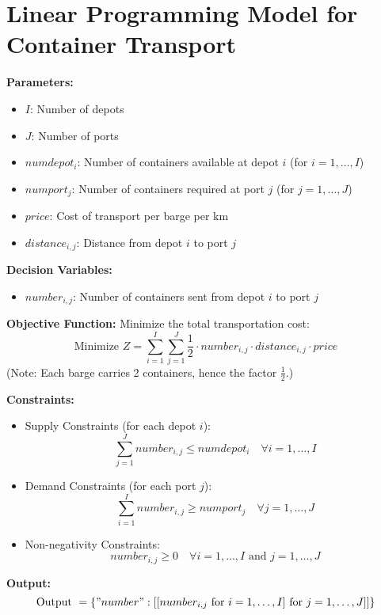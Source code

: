 \documentclass{article}
\begin{document}
\section*{Linear Programming Model for Container Transport}

\textbf{Parameters:}
\begin{itemize}
    \item $I$: Number of depots
    \item $J$: Number of ports
    \item $numdepot_i$: Number of containers available at depot $i$ (for $i = 1, \ldots, I$)
    \item $numport_j$: Number of containers required at port $j$ (for $j = 1, \ldots, J$)
    \item $price$: Cost of transport per barge per km
    \item $distance_{i,j}$: Distance from depot $i$ to port $j$
\end{itemize}

\textbf{Decision Variables:}
\begin{itemize}
    \item $number_{i,j}$: Number of containers sent from depot $i$ to port $j$
\end{itemize}

\textbf{Objective Function:}
Minimize the total transportation cost:
\[
\text{Minimize } Z = \sum_{i=1}^{I} \sum_{j=1}^{J} \frac{1}{2} \cdot number_{i,j} \cdot distance_{i,j} \cdot price
\]
(Note: Each barge carries 2 containers, hence the factor $\frac{1}{2}$.)

\textbf{Constraints:}
\begin{itemize}
    \item Supply Constraints (for each depot $i$):
    \[
    \sum_{j=1}^{J} number_{i,j} \leq numdepot_i \quad \forall i = 1, \ldots, I
    \]
    
    \item Demand Constraints (for each port $j$):
    \[
    \sum_{i=1}^{I} number_{i,j} \geq numport_j \quad \forall j = 1, \ldots, J
    \]
    
    \item Non-negativity Constraints:
    \[
    number_{i,j} \geq 0 \quad \forall i = 1, \ldots, I \text{ and } j = 1, \ldots, J
    \]
\end{itemize}

\textbf{Output:}
\[
\text{Output } = \{ "number": [[number_{i,j} \text{ for } i = 1,\ldots,I] \text{ for } j = 1,\ldots,J] ] \}
\]
\end{document}
